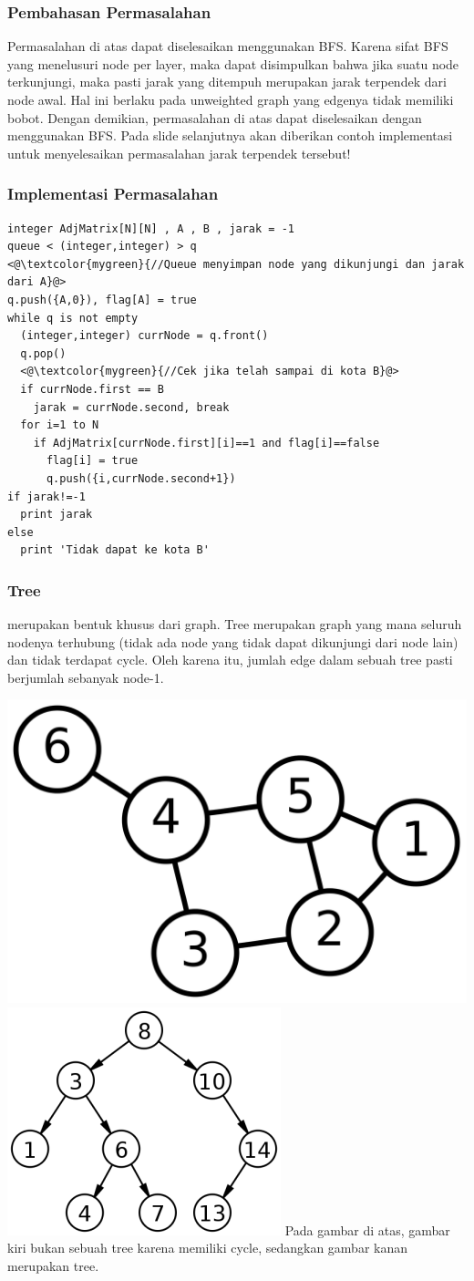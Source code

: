 \begin{frame}
\frametitle{Pembahasan Permasalahan}
Permasalahan di atas dapat diselesaikan menggunakan BFS. Karena sifat BFS yang menelusuri node per layer, maka dapat disimpulkan bahwa jika suatu node terkunjungi, maka pasti jarak yang ditempuh merupakan jarak terpendek dari node awal. Hal ini berlaku pada unweighted graph yang edgenya tidak memiliki bobot.
\newline\newline
Dengan demikian, permasalahan di atas dapat diselesaikan dengan menggunakan BFS. Pada slide selanjutnya akan diberikan contoh implementasi untuk menyelesaikan permasalahan jarak terpendek tersebut!
\end{frame}

\begin{frame}[fragile]
\frametitle{Implementasi Permasalahan}

\begin{lstlisting}
integer AdjMatrix[N][N] , A , B , jarak = -1
queue < (integer,integer) > q
<@\textcolor{mygreen}{//Queue menyimpan node yang dikunjungi dan jarak dari A}@>
q.push({A,0}), flag[A] = true
while q is not empty
  (integer,integer) currNode = q.front()
  q.pop()
  <@\textcolor{mygreen}{//Cek jika telah sampai di kota B}@>
  if currNode.first == B
    jarak = currNode.second, break
  for i=1 to N
    if AdjMatrix[currNode.first][i]==1 and flag[i]==false
      flag[i] = true
      q.push({i,currNode.second+1})
if jarak!=-1
  print jarak
else
  print 'Tidak dapat ke kota B'		
\end{lstlisting}
\end{frame}

\begin{frame}
\frametitle{Tree}
 merupakan bentuk khusus dari graph. Tree merupakan graph yang mana seluruh nodenya terhubung (tidak ada node yang tidak dapat dikunjungi dari node lain) dan tidak terdapat cycle. Oleh karena itu, jumlah edge dalam sebuah tree pasti berjumlah sebanyak node-1.

\includegraphics[width=4 cm]{asset/not-tree.png}
\hspace{\fill}
\includegraphics[width=4 cm]{asset/tree.png}
\newline\newline
Pada gambar di atas, gambar kiri bukan sebuah tree karena memiliki cycle, sedangkan gambar kanan merupakan tree. 
\end{frame}

